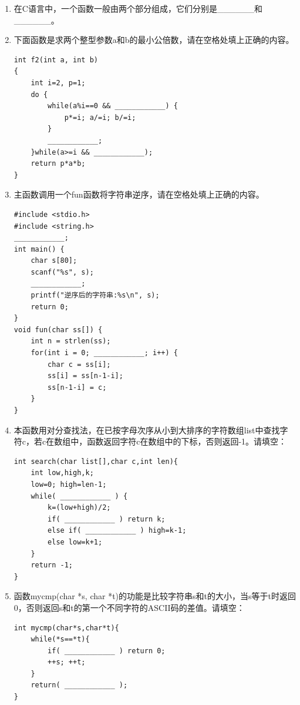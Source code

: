 \documentclass[a4paper,12pt]{article}
\begin{document}
\begin{enumerate}
	\item 在C语言中，一个函数一般由两个部分组成，它们分别是\_\_\_\_\_\_和\_\_\_\_\_\_。
	      \vspace{0.3cm}

	\item 下面函数是求两个整型参数a和b的最小公倍数，请在空格处填上正确的内容。
	      \begin{verbatim}
int f2(int a, int b)
{
    int i=2, p=1;
    do {
        while(a%i==0 && ____________) {
            p*=i; a/=i; b/=i;
        }
        ____________;
    }while(a>=i && ____________);
    return p*a*b;
}
    \end{verbatim}
	      \vspace{0.3cm}

	\item 主函数调用一个fun函数将字符串逆序，请在空格处填上正确的内容。
	      \begin{verbatim}
#include <stdio.h>
#include <string.h>
____________;
int main() {
    char s[80];
    scanf("%s", s);
    ____________;
    printf("逆序后的字符串:%s\n", s);
    return 0;
}
void fun(char ss[]) {
    int n = strlen(ss);
    for(int i = 0; ____________; i++) {
        char c = ss[i];
        ss[i] = ss[n-1-i];
        ss[n-1-i] = c;
    }
}
    \end{verbatim}
	      \vspace{0.3cm}

	\item 本函数用对分查找法，在已按字母次序从小到大排序的字符数组list中查找字符c，若c在数组中，函数返回字符c在数组中的下标，否则返回-1。请填空：
	      \begin{verbatim}
int search(char list[],char c,int len){
    int low,high,k;
    low=0; high=len-1;
    while( ____________ ) {
        k=(low+high)/2;
        if( ____________ ) return k;
        else if( ____________ ) high=k-1;
        else low=k+1;
    }
    return -1;
}
    \end{verbatim}
	      \vspace{0.3cm}

	\item 函数mycmp(char *s, char *t)的功能是比较字符串s和t的大小，当s等于t时返回0，否则返回s和t的第一个不同字符的ASCII码的差值。请填空：
	      \begin{verbatim}
int mycmp(char*s,char*t){
    while(*s==*t){
        if( ____________ ) return 0;
        ++s; ++t;
    }
    return( ____________ );
}
    \end{verbatim}
	      \vspace{0.3cm}


\end{enumerate}
\end{document}
